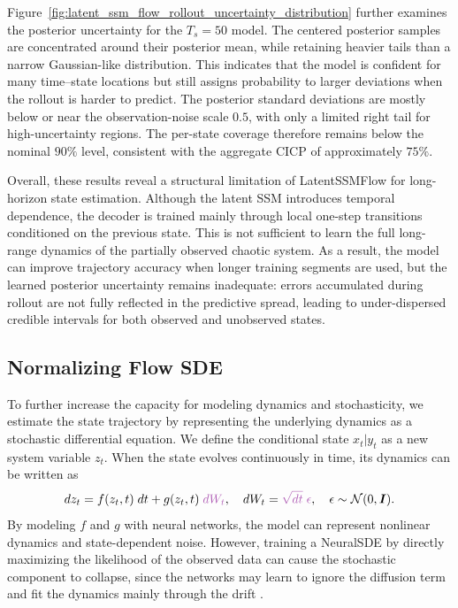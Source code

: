 Figure~\ref{fig:latent_ssm_flow_rollout_uncertainty_distribution} further examines the posterior uncertainty for the $T_s=50$ model. The centered posterior samples are concentrated around their posterior mean, while retaining heavier tails than a narrow Gaussian-like distribution. This indicates that the model is confident for many time--state locations but still assigns probability to larger deviations when the rollout is harder to predict. The posterior standard deviations are mostly below or near the observation-noise scale $0.5$, with only a limited right tail for high-uncertainty regions. The per-state coverage therefore remains below the nominal $90\%$ level, consistent with the aggregate \ac{CICP} of approximately $75\%$. 

Overall, these results reveal a structural limitation of LatentSSMFlow for long-horizon state estimation. Although the latent \ac{SSM} introduces temporal dependence, the decoder is trained mainly through local one-step transitions conditioned on the previous state. This is not sufficient to learn the full long-range dynamics of the partially observed chaotic system. As a result, the model can improve trajectory accuracy when longer training segments are used, but the learned posterior uncertainty remains inadequate: errors accumulated during rollout are not fully reflected in the predictive spread, leading to under-dispersed credible intervals for both observed and unobserved states. 

\subsection{Normalizing Flow SDE}
To further increase the capacity for modeling dynamics and stochasticity, we estimate the state trajectory by representing the underlying dynamics as a stochastic differential equation. We define the conditional state $x_t| y_t$ as a new system variable $z_t$. When the state evolves continuously in time, its dynamics can be written as
\begin{equation}
    dz_t = f(z_t, t)\; dt + g(z_t, t)\;{\color{Orchid} dW_t},\quad dW_t={\color{Orchid} \sqrt{dt}\;\epsilon}, \quad \epsilon\sim \mathcal{N}(0, \boldsymbol{I}).
\end{equation}
By modeling $f$ and $g$ with neural networks, the model can represent nonlinear dynamics and state-dependent noise. However, training a NeuralSDE by directly maximizing the likelihood of the observed data can cause the stochastic component to collapse, since the networks may learn to ignore the diffusion term and fit the dynamics mainly through the drift \citep{NEURIPS2019_07211688}.

